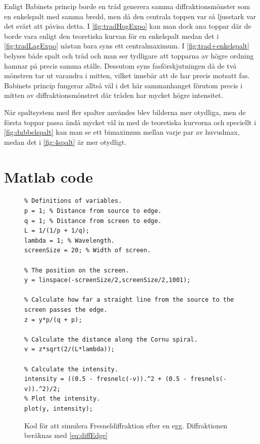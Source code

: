 \documentclass[a4paper]{article}
\begin{document}
  Enligt Babinets princip borde en tråd generera samma diffraktionsmönster som en enkelspalt med samma bredd, men då den centrala toppen var så ljusstark var det svårt att påvisa detta. I \autoref{fig:tradHogExpo} kan man dock ana toppar där de borde vara enligt den teoretiska kurvan för en enkelspalt medan det i \autoref{fig:tradLagExpo} nästan bara syns ett centralmaximum. I \autoref{fig:trad+enkelspalt} belyses både spalt och tråd och man ser tydligare att topparna av högre ordning hamnar på precis samma ställe. Dessutom syns fasförskjutningen då de två mönstren tar ut varandra i mitten, vilket innebär att de har precis motsatt fas. Babinets princip fungerar alltså väl i det här sammanhanget förutom precis i mitten av diffraktionsmönstret där tråden har mycket högre intensitet.
  
  När spaltsystem med fler spalter användes blev bilderna mer otydliga, men de första toppar passa ändå mycket väl in med de teoretiska kurvorna och speciellt i \autoref{fig:dubbelspalt} kan man se ett bimaximum mellan varje par av huvudmax, medan det i \autoref{fig:4spalt} är mer otydligt.
  
  

 
 {}
 

\clearpage
\appendix

\section{Matlab code} \label{apx:code}

\FloatBarrier

  \begin{figure}[ht]
  \centering
  \begin{lstlisting}
% Definitions of variables.
p = 1; % Distance from source to edge.
q = 1; % Distance from screen to edge.
L = 1/(1/p + 1/q);
lambda = 1; % Wavelength.
screenSize = 20; % Width of screen.

% The position on the screen.
y = linspace(-screenSize/2,screenSize/2,1001);

% Calculate how far a straight line from the source to the screen passes the edge.
z = y*p/(q + p);

% Calculate the distance along the Cornu spiral.
v = z*sqrt(2/(L*lambda));

% Calculate the intensity.
intensity = ((0.5 - fresnelc(-v)).^2 + (0.5 - fresnels(-v)).^2)/2;
% Plot the intensity.
plot(y, intensity);
  \end{lstlisting}
  \caption{Kod för att simulera Fresneldiffraktion efter en egg. Diffraktionen beräknas med \eqref{eq:diffEdge}}
  \label{fig:FresnCode}
  \end{figure}
\end{document}
